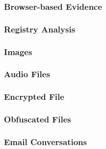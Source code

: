 \documentclass[a4paper,12pt]{article}
\begin{document}
\subsubsection{Browser-based Evidence}
\label{sec:browser_based_evidence}
\lipsum[66]
\subsubsection{Registry Analysis}
\label{sec:registry_analysis}
\lipsum[66]
\subsubsection{Images}
\label{sec:images}
\lipsum[66]
\subsubsection{Audio Files}
\label{sec:media_files}
\lipsum[66]
\subsubsection{Encrypted File}
\label{sec:encrypted_file}
\lipsum[66]
\subsubsection{Obfuscated Files}
\label{sec:obfuscated_files}
\lipsum[66]
\subsubsection{Email Conversations}
\label{sec:email_conversations}
\lipsum[66]
\end{document}
